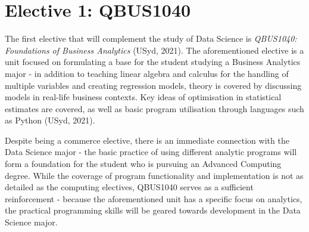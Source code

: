 \documentclass[11pt, a4paper]{report}
\begin{document}
\section{\textbf{Elective 1: QBUS1040}}


The first elective that will complement the study of Data Science is \textit{QBUS1040: Foundations of Business Analytics} (USyd, 2021). The aforementioned elective is a unit focused on formulating a base for the student studying a Business Analytics major - in addition to teaching linear algebra and calculus for the handling of multiple variables and creating regression models, theory is covered by discussing models in real-life business contexts. Key ideas of optimisation in statistical estimates are covered, as well as basic program utilisation through languages such as Python (USyd, 2021). 


Despite being a commerce elective, there is an immediate connection with the Data Science major - the basic practice of using different analytic programs will form a foundation for the student who is pursuing an Advanced Computing degree. While the coverage of program functionality and implementation is not as detailed as the computing electives, QBUS1040 serves as a sufficient reinforcement - because the aforementioned unit has a specific focus on analytics, the practical programming skills will be geared towards development in the Data Science major. 
\end{document}
